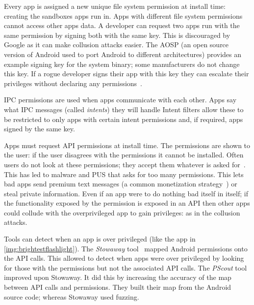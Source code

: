 \documentclass[a4paper,sfsidenotes]{%
  article%
}
\begin{document}
Every app is assigned a new unique file system permission at install time:
creating the sandboxes apps run in.  Apps with different file system permissions
cannot access other apps data.  A developer can request two apps run with the
same permission by signing both with the same key.  This is discouraged by
Google as it can make collusion attacks easier.  The \ac{AOSP} (an open source
version of Android used to port Android to different architectures) provides an
example signing key for the system binary; some manufacturers do not change this
key.  If a rogue developer signs their app with this key they can escalate their
privileges without declaring any permissions~\cite{Zheng:vb}.

IPC permissions are used when apps communicate with each other.  Apps say what
IPC messages (called \emph{intents}) they will handle  Intent filters allow
these to be restricted to only apps with certain intent permissions and, if
required, apps signed by the same key.

Apps must request API permissions at install time.  The permissions are shown to
the user: if the user disagrees with the permissions it cannot be installed.
Often users do not look at these permissions; they accept them whatever is asked
for~\cite{Felt:2012hm}.  This has led to malware and \ac{PUS} that asks for too
many permissions. This lets bad apps send premium text messages (a common
monetization strategy~\cite{Chien:2011vw}) or steal private information.  Even
if an app were to do nothing bad itself in itself; if the functionality exposed
by the permission is exposed in an API then other apps could collude with the
overprivileged app to gain privileges: as in the collusion attacks.

Tools can detect when an app is over privileged (like the app in
\autoref{img:brightestflashlight}). The \emph{Stowaway}
tool~\cite{Felt:2011kj} mapped Android permissions onto the API calls. This
allowed \citeauthor*{Felt:2011kj} to detect when apps were over privileged by
looking for those with the permissions but not the associated API calls. The
\emph{PScout} tool~\cite{Au:2012ju} improved upon Stowaway.  It did this by
increasing the accuracy of the map between API calls and permissions. They built
their map from the Android source code; whereas Stowaway used fuzzing.
\end{document}

